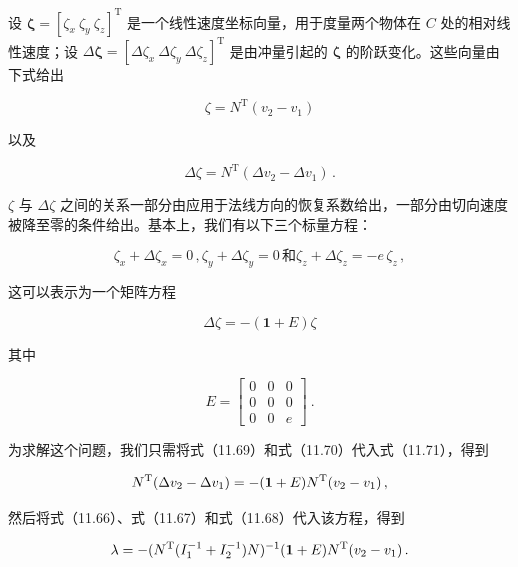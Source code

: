 \documentclass[10pt,a4paper]{book}
\theoremstyle{thmstyle} %
\theoremstyle{defstyle} %
\theoremstyle{prostyle} %
\begin{document}
设 $\boldsymbol{\zeta}=[\zeta_{x}\ \zeta_{y}\ \zeta_{z}]^{\mathrm{T}}$ 是一个线性速度坐标向量，用于度量两个物体在 $C$ 处的相对线性速度；设 $\Delta\boldsymbol{\zeta}=[\Delta\zeta_{x}\ \Delta\zeta_{y}\ \Delta\zeta_{z}]^{\mathrm{T}}$ 是由冲量引起的 $\boldsymbol{\zeta}$ 的阶跃变化。这些向量由下式给出



$$
\zeta = N ^{\mathrm{T}} ( v _{2} - v _{1} )
$$



以及



$$
\Delta \zeta = N ^{\mathrm{T}} ( \Delta v _{2} - \Delta v _{1} ) \, .
$$



$\zeta$ 与 $\Delta\zeta$ 之间的关系一部分由应用于法线方向的恢复系数给出，一部分由切向速度被降至零的条件给出。基本上，我们有以下三个标量方程：



$$
\zeta _{x} + \Delta \zeta _{x} = 0 \, , \zeta _{y} + \Delta \zeta _{y} = 0 \, 和 \zeta _{z} + \Delta \zeta _{z} = - e \, \zeta _{z} \, ,
$$



这可以表示为一个矩阵方程



$$
\Delta \zeta = - ( \mathbf{1} + E ) \zeta
$$



其中



$$
E = { \left[ \begin{array}{lll} { 0 } & { 0 } & { 0 } \\{ 0 } & { 0 } & { 0 } \\{ 0 } & { 0 } & { e } \end{array} \right] } \ .
$$



为求解这个问题，我们只需将式（11.69）和式（11.70）代入式（11.71），得到



$$
N ^{\mathrm { T} } ( \Delta v _ { 2 } - \Delta v _ { 1 } ) = - ( { \bf 1 } + E ) N ^{\mathrm { T} } ( v _ { 2 } - v _ { 1 } ) \, ,
$$



然后将式（11.66）、式（11.67）和式（11.68）代入该方程，得到



$$
\lambda = - ( N ^{\mathrm { T} } ( I _ { 1 } ^{- 1} + I _ { 2 } ^{- 1} ) N ) ^{- 1} ( { \bf 1 } + E ) N ^{\mathrm { T} } ( v _ { 2 } - v _ { 1 } ) \, .
$$
\end{document}
